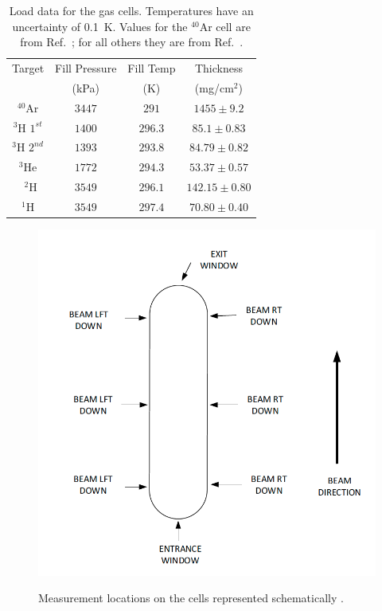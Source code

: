\documentclass[review,numbers,sort&compress]{elsarticle}
\begin{document}
\begin{table}[!h]
\centering
\begin{adjustbox}{width=0.5\textwidth}
\begin{tabular}{cccc}
	\hline 
	Target       & Fill Pressure & Fill Temp    & Thickness \\
	     		 &	(kPa)		 &	(K) 	    & (mg/cm$^2$) \\
	\hline 
	$^{40}$Ar	 & $3447$ 		 & $291$	    &  $1455\pm9.2$ \\ 
	
	$^{3}$H $1^{st}$ 	 & $1400$		 & $296.3$	    &  $85.1\pm 0.83$ \\ 
	
	$^{3}$H $2^{nd}$	 & $1393$		 & $293.8$		&  $84.79\pm0.82$ \\
	
	$^{3}$He	 & $1772$		 & $294.3$	    &  $53.37\pm0.57$ \\ 
	\
	$^{2}$H 	 & $3549$		 & $296.1$	    &  $142.15\pm0.80$ \\ 
	
	$^{1}$H 	 & $3549$		 & $297.4$	    &  $70.80\pm0.40$ \\ 
	\hline 
\end{tabular}
\end{adjustbox}
\caption{Load data for the gas cells. Temperatures have an uncertainty of 0.1~K.  Values for the $^{40}$Ar 
         cell are from Ref.~\cite{ar_config}; for all others they are from Ref.~\cite{cellconfig}.}
\label{tab:fill_tar}
\end{table}

\begin{figure}[!h]
  \centering
  \includegraphics[width=\linewidth]{images/tgt_measurements.png}\\
  \caption{Measurement locations on the cells represented schematically \cite{cellconfig}.}
  \label{fig:cellconfig}
\end{figure}
\end{document}
